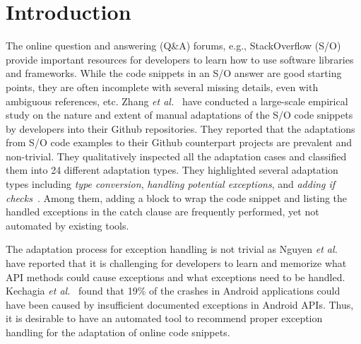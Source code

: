 \section{Introduction}
\label{sec:intro}

The online question and answering (Q\&A) forums, e.g., StackOverflow
(S/O) provide important resources for developers to learn how to use
software libraries and frameworks. While the code snippets in an S/O
answer are good starting points, they are often incomplete with
several missing details, even with ambiguous references, etc.  Zhang
{\em et al.}~\cite{zhang-icse19} have conducted a large-scale
empirical study on the nature and extent of manual adaptations of the
S/O code snippets by developers into their Github repositories.  They
reported that the adaptations from S/O code examples to their
Github counterpart projects are prevalent and non-trivial. They
qualitatively inspected all the adaptation cases and classified them
into 24 different adaptation types. They highlighted several
adaptation types including {\em type conversion}, {\em handling
  potential exceptions}, and {\em adding if
  checks}~\cite{zhang-icse19}. Among them, adding a 
block to wrap the code snippet and listing the handled
exceptions in the catch clause are frequently performed,
yet not automated by existing tools.

The adaptation process for exception handling is not trivial as Nguyen
{\em et al.}~\cite{xrank-fse20} have reported that it is challenging
for developers to learn and memorize what API methods could cause
exceptions and what exceptions need to be handled. Kechagia {\em et
  al.}~\cite{kechagia-msr14} found that 19\% of the crashes in Android
applications could have been caused by insufficient documented
exceptions in Android APIs. Thus, it is desirable to have an automated
tool to recommend proper exception handling for the adaptation of
online code snippets.


